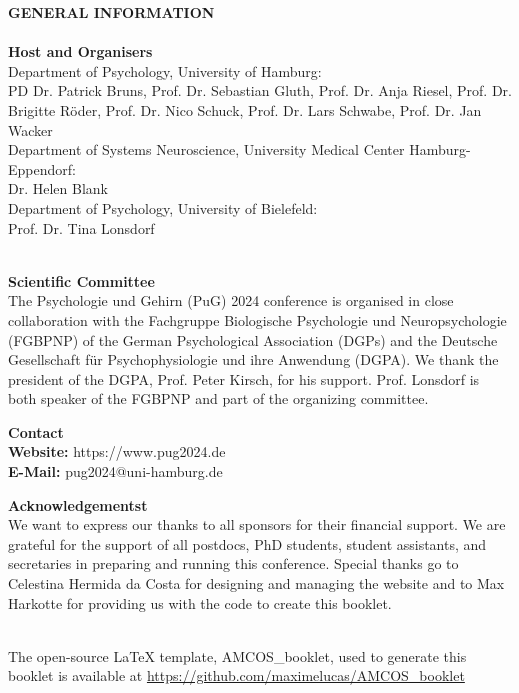 \vspace*{1cm}
\begin{center}
	\textbf{GENERAL INFORMATION} \\
	\ \\[\baselineskip]

	\textcolor{\primarycolor}{\textbf{Host and Organisers}}	 \\
	Department of Psychology, University of Hamburg: \\
	PD Dr. Patrick Bruns, Prof. Dr. Sebastian Gluth, Prof. Dr. Anja Riesel, Prof. Dr. Brigitte Röder, Prof. Dr. Nico Schuck, Prof. Dr. Lars Schwabe, Prof. Dr. Jan Wacker \\
	\vspace*{0.1cm}
	Department of Systems Neuroscience, University Medical Center Hamburg-Eppendorf: \\
	Dr. Helen Blank \\
	\vspace*{0.1cm}
	Department of Psychology, University of Bielefeld: \\
	Prof. Dr. Tina Lonsdorf \\
	\ \\[\baselineskip]
	\vspace*{0.1cm}
	
	\textcolor{\primarycolor}{\textbf {Scientific Committee}}	 \\
	The Psychologie und Gehirn (PuG) 2024 conference is organised in close collaboration with the Fachgruppe Biologische Psychologie und Neuropsychologie (FGBPNP) of the German Psychological Association (DGPs) and the Deutsche Gesellschaft für Psychophysiologie und ihre Anwendung (DGPA). We thank the president of the DGPA, Prof. Peter Kirsch, for his support. Prof. Lonsdorf is both speaker of the FGBPNP and part of the organizing committee.
	\\[\baselineskip]
	\vspace*{0.1cm}

	\textcolor{\primarycolor}{\textbf {Contact}}	 \\
	\textbf{Website:} https://www.pug2024.de \\
	\textbf{E-Mail:} pug2024@uni-hamburg.de
	\\[\baselineskip]
	\vspace*{0.1cm}

	\textcolor{\primarycolor}{\textbf {Acknowledgementst}}	 \\
	We want to express our thanks to all sponsors for their financial support. We are grateful for the support of all postdocs, PhD students, student assistants, and secretaries in preparing and running this conference. Special thanks go to Celestina Hermida da Costa for designing and managing the website and to Max Harkotte for providing us with the code to create this booklet.

\end{center}
\mbox{}
\thispagestyle{empty}
\vfill
\begin{center}
	\ \\[20pt] %
	The open-source \LaTeX{} template, AMCOS\_booklet, used to generate this booklet is available at \url{https://github.com/maximelucas/AMCOS\_booklet}
\end{center}

\newpage